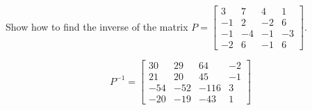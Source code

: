 
\begin{exerciseStatement}


Show how to find the inverse of the matrix \(P= \left[\begin{array}{cccc}
3 & 7 & 4 & 1 \\
-1 & 2 & -2 & 6 \\
-1 & -4 & -1 & -3 \\
-2 & 6 & -1 & 6
\end{array}\right] \).


\end{exerciseStatement}
    
\begin{exerciseAnswer} 
\[P^{-1}= \left[\begin{array}{cccc}
30 & 29 & 64 & -2 \\
21 & 20 & 45 & -1 \\
-54 & -52 & -116 & 3 \\
-20 & -19 & -43 & 1
\end{array}\right] \]
\end{exerciseAnswer}
    
